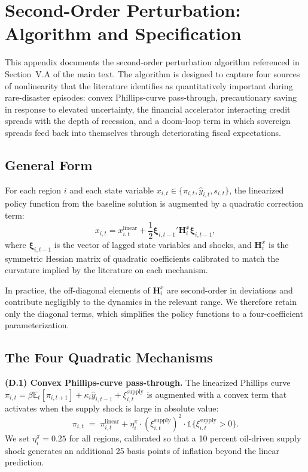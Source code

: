 \documentclass[12pt,a4paper]{article}
\begin{document}
\section{Second-Order Perturbation: Algorithm and Specification}
\label{app:nonlinear}

This appendix documents the second-order perturbation algorithm referenced in Section~V.A of the main text. The algorithm is designed to capture four sources of nonlinearity that the literature identifies as quantitatively important during rare-disaster episodes: convex Phillips-curve pass-through, precautionary saving in response to elevated uncertainty, the financial accelerator interacting credit spreads with the depth of recession, and a doom-loop term in which sovereign spreads feed back into themselves through deteriorating fiscal expectations.

\subsection{General Form}

For each region $i$ and each state variable $x_{i,t} \in \{\pi_{i,t}, \hat{y}_{i,t}, s_{i,t}\}$, the linearized policy function from the baseline solution is augmented by a quadratic correction term:
\begin{equation}
x_{i,t} = x_{i,t}^{\text{linear}} + \frac{1}{2} \boldsymbol{\xi}_{i,t-1}' \mathbf{H}^x_i \boldsymbol{\xi}_{i,t-1},
\end{equation}
where $\boldsymbol{\xi}_{i,t-1}$ is the vector of lagged state variables and shocks, and $\mathbf{H}^x_i$ is the symmetric Hessian matrix of quadratic coefficients calibrated to match the curvature implied by the literature on each mechanism.

In practice, the off-diagonal elements of $\mathbf{H}^x_i$ are second-order in deviations and contribute negligibly to the dynamics in the relevant range. We therefore retain only the diagonal terms, which simplifies the policy functions to a four-coefficient parameterization.

\subsection{The Four Quadratic Mechanisms}

\textbf{(D.1) Convex Phillips-curve pass-through.} The linearized Phillips curve $\pi_{i,t} = \beta \mathbb{E}_t[\pi_{i,t+1}] + \kappa_i \hat{y}_{i,t-1} + \xi^{\text{supply}}_{i,t}$ is augmented with a convex term that activates when the supply shock is large in absolute value:
\begin{equation}
\pi_{i,t} \;=\; \pi_{i,t}^{\text{linear}} + \eta^\pi_i \cdot (\xi^{\text{supply}}_{i,t})^2 \cdot \mathbb{1}\{\xi^{\text{supply}}_{i,t} > 0\}.
\end{equation}
We set $\eta^\pi_i = 0.25$ for all regions, calibrated so that a 10 percent oil-driven supply shock generates an additional 25 basis points of inflation beyond the linear prediction.
\end{document}
